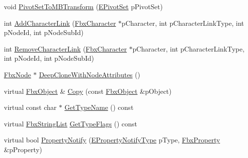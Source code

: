 \begin{DoxyCompactItemize}
\item 
void \hyperlink{class_fbx_node_aa7c5504f8f25c706e609b185fd299e34}{Pivot\+Set\+To\+M\+B\+Transform} (\hyperlink{class_fbx_node_ae62b7311ac4727654cdf1ebd5cbf7343}{E\+Pivot\+Set} p\+Pivot\+Set)
\item 
int \hyperlink{class_fbx_node_ad534d65600668327fe8abdd8f7628c1e}{Add\+Character\+Link} (\hyperlink{class_fbx_character}{Fbx\+Character} $\ast$p\+Character, int p\+Character\+Link\+Type, int p\+Node\+Id, int p\+Node\+Sub\+Id)
\item 
int \hyperlink{class_fbx_node_ace2096451cb7e54375da497d1004b30b}{Remove\+Character\+Link} (\hyperlink{class_fbx_character}{Fbx\+Character} $\ast$p\+Character, int p\+Character\+Link\+Type, int p\+Node\+Id, int p\+Node\+Sub\+Id)
\item 
\hyperlink{class_fbx_node}{Fbx\+Node} $\ast$ \hyperlink{class_fbx_node_a40137ec5e59d6756452dfc4e65ae14cb}{Deep\+Clone\+With\+Node\+Attributes} ()
\item 
virtual \hyperlink{class_fbx_object}{Fbx\+Object} \& \hyperlink{class_fbx_node_acec7efc95b031e3711971e4f6eb01145}{Copy} (const \hyperlink{class_fbx_object}{Fbx\+Object} \&p\+Object)
\item 
virtual const char $\ast$ \hyperlink{class_fbx_node_a802220645ef4d155755ebbf6f746a15c}{Get\+Type\+Name} () const
\item 
virtual \hyperlink{class_fbx_string_list}{Fbx\+String\+List} \hyperlink{class_fbx_node_a0356213c5c7afc57a03002db8b002af7}{Get\+Type\+Flags} () const
\item 
virtual bool \hyperlink{class_fbx_node_ac0edd8ef92070544e170bd0a38ed1efc}{Property\+Notify} (\hyperlink{class_fbx_object_a528f1b2c2b7abbd64c525ba3a9a496b8}{E\+Property\+Notify\+Type} p\+Type, \hyperlink{class_fbx_property}{Fbx\+Property} \&p\+Property)
\end{DoxyCompactItemize}
